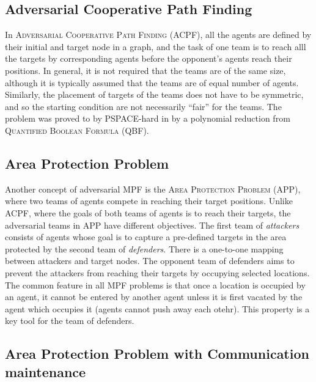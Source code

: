 \subsection{Adversarial Cooperative Path Finding}

In \textsc{Adversarial Cooperative Path Finding} (ACPF), all the agents are defined by their initial and target node in a graph, 
and the task of one team is to reach alll the targets by corresponding agents before the opponent's agents reach their positions.
In general, it is not required that the teams are of the same size, although it is typically assumed that the teams are of equal number of agents.
Similarly, the placement of targets of the teams does not have to be symmetric, and so the starting condition are not necessarily ``fair'' for the teams.
The problem was proved to by PSPACE-hard in \cite{ivanova04} by a polynomial reduction from \textsc{Quantified Boolean Formula} (QBF).

\subsection{Area Protection Problem}

Another concept of adversarial MPF is the \textsc{Area Protection Problem} (APP), where two teams of agents compete in reaching their target positions. 
Unlike ACPF, where the goals of both teams of agents is to reach their targets, the adversarial teams in APP have different objectives. 
The first team of \emph{attackers} consists of agents whose goal is to capture a pre-defined targets in the area protected by the second team of \emph{defenders}. 
There is a one-to-one mapping between attackers and target nodes.
The opponent team of defenders aims to prevent the attackers from reaching their targets by occupying selected locations.
The common feature in all MPF problems is that once a location is occupied by an agent, 
it cannot be entered by another agent unless it is first vacated by the agent which occupies it (agents cannot push away each otehr). 
This property is a key tool for the team of defenders.

\subsection{Area Protection Problem with Communication maintenance}

